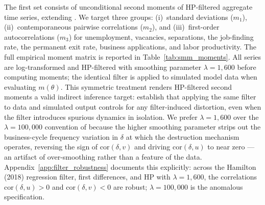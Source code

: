 \documentclass[authoryear, review, 12pt]{elsarticle}
\begin{document}
	The first set consists of unconditional second moments of HP-filtered aggregate
	time series, extending \citet{coles_2018}. We target three groups: (i)~standard
	deviations ($m_1$), (ii)~contemporaneous pairwise correlations ($m_2$), and
	(iii)~first-order autocorrelations ($m_3$) for unemployment, vacancies,
	separations, the job-finding rate, the permanent exit rate, business
	applications, and labor productivity. The full empirical moment matrix is
	reported in Table~\ref{tab:smm_moments}. All series are log-transformed and
	HP-filtered with smoothing parameter $\lambda = 1{,}600$ before computing
	moments; the identical filter is applied to simulated model data when evaluating
	$m(\theta)$. This symmetric treatment renders HP-filtered second moments a valid
	indirect inference target: \citet{canova_2011} establish that applying
	the same filter to data and simulated output controls for any filter-induced
	distortion, even when the filter introduces spurious dynamics in isolation.
	We prefer $\lambda=1{,}600$ over the $\lambda=100{,}000$ convention of
	\citet{coles_2018} because the higher smoothing parameter strips out the
	business-cycle frequency variation in $\delta$ at which the destruction
	mechanism operates, reversing the sign of $\text{cor}(\delta,v)$ and driving
	$\text{cor}(\delta,u)$ to near zero --- an artifact of over-smoothing rather
	than a feature of the data.  Appendix~\ref{app:filter_robustness} documents
	this explicitly: across the Hamilton (2018) regression filter, first differences,
	and HP with $\lambda=1{,}600$, the correlations $\text{cor}(\delta,u)>0$ and
	$\text{cor}(\delta,v)<0$ are robust; $\lambda=100{,}000$ is the anomalous
	specification.
\end{document}
